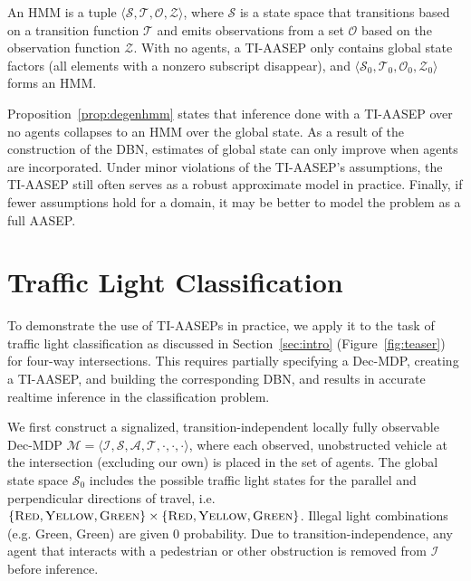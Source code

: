 \documentclass[letterpaper,10pt,conference]{ieeeconf}
\let\proof\relax
\let\endproof\relax
\newenvironment{proofsketch}{%
    \renewcommand{\proofname}{Proof Sketch}\proof}{\endproof}
\begin{document}
\begin{proofsketch}
   An HMM is a tuple $\langle \mathcal{S,T,O,Z} \rangle$, where $\mathcal{S}$ is a state space that transitions based on a transition function $\mathcal{T}$ and emits observations from a set $\mathcal{O}$ based on the observation function $\mathcal{Z}$. With no agents, a TI-AASEP only contains global state factors (all elements with a nonzero subscript disappear), and $\langle \mathcal{S}_0,\mathcal{T}_0, \mathcal{O}_0, \mathcal{Z}_0 \rangle$ forms an HMM. 
\end{proofsketch}

Proposition~\ref{prop:degenhmm} states that inference done with a TI-AASEP over no agents collapses to an HMM over the global state. As a result of the construction of the DBN, estimates of global state can only improve when agents are incorporated. Under minor violations of the TI-AASEP's assumptions, the TI-AASEP still often serves as a robust approximate model in practice. Finally, if fewer assumptions hold for a domain, it may be better to model the problem as a full AASEP.
 
\section{Traffic Light Classification}

To demonstrate the use of TI-AASEPs in practice, we apply it to the task of traffic light classification as discussed in Section~\ref{sec:intro} (Figure~\ref{fig:teaser}) for four-way intersections. This requires partially specifying a Dec-MDP, creating a TI-AASEP, and building the corresponding DBN, and results in accurate realtime inference in the classification problem.

We first construct a signalized, transition-independent locally fully observable Dec-MDP 
$\mathcal{M} = \langle \mathcal{I}, \mathcal{S}, \mathcal{A}, \mathcal{T}, \cdot, \cdot, \cdot \rangle$, 
where each observed, unobstructed vehicle at the intersection (excluding our own) is placed in the set of agents. The global state space $\mathcal{S}_0$ includes the possible traffic light states for the parallel and perpendicular directions of travel, i.e.\ $\{ \textsc{Red}, \textsc{Yellow}, \textsc{Green}\} \times \{ \textsc{Red}, \textsc{Yellow}, \textsc{Green}\}$. Illegal light combinations (e.g. Green, Green) are given 0 probability. Due to transition-independence, any agent that interacts with a pedestrian or other obstruction is removed from $\mathcal{I}$ before inference.
\end{document}
